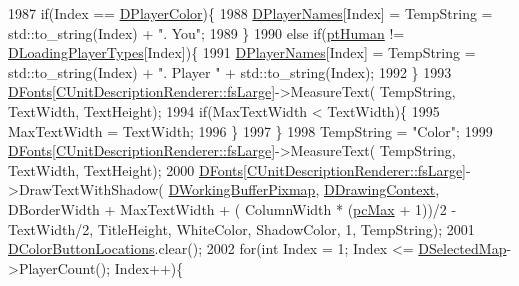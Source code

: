 \begin{DoxyCode}
1987         \textcolor{keywordflow}{if}(Index == \hyperlink{classCApplicationData_a53550939b20cba70570f113e4d1c5d02}{DPlayerColor})\{
1988             \hyperlink{classCApplicationData_a446d88c378b95b1a4f88071612229086}{DPlayerNames}[Index] = TempString = std::to\_string(Index) + \textcolor{stringliteral}{". You"};   
1989         \}
1990         \textcolor{keywordflow}{else} \textcolor{keywordflow}{if}(\hyperlink{classCApplicationData_ae04b6b340297311972ce1e955196fcaaaf06f9bc64db8860bc03ecc330b11f234}{ptHuman} != \hyperlink{classCApplicationData_a2ac5711b027842d57aa5f8e5a7adc589}{DLoadingPlayerTypes}[Index])\{
1991             \hyperlink{classCApplicationData_a446d88c378b95b1a4f88071612229086}{DPlayerNames}[Index] = TempString = std::to\_string(Index) + \textcolor{stringliteral}{". Player "} + 
      std::to\_string(Index);   
1992         \}
1993         \hyperlink{classCApplicationData_afde9247d0a3ea87393ec86dcdb1e8274}{DFonts}[\hyperlink{classCUnitDescriptionRenderer_a3ea4cd83b6dd9533ab3abb953a7da35aaf467097fe4f4811a5e2f1959c86e071d}{CUnitDescriptionRenderer::fsLarge}]->MeasureText(
      TempString, TextWidth, TextHeight);
1994         \textcolor{keywordflow}{if}(MaxTextWidth < TextWidth)\{
1995             MaxTextWidth = TextWidth;   
1996         \}
1997     \}
1998     TempString = \textcolor{stringliteral}{"Color"};
1999     \hyperlink{classCApplicationData_afde9247d0a3ea87393ec86dcdb1e8274}{DFonts}[\hyperlink{classCUnitDescriptionRenderer_a3ea4cd83b6dd9533ab3abb953a7da35aaf467097fe4f4811a5e2f1959c86e071d}{CUnitDescriptionRenderer::fsLarge}]->MeasureText(
      TempString, TextWidth, TextHeight);
2000     \hyperlink{classCApplicationData_afde9247d0a3ea87393ec86dcdb1e8274}{DFonts}[\hyperlink{classCUnitDescriptionRenderer_a3ea4cd83b6dd9533ab3abb953a7da35aaf467097fe4f4811a5e2f1959c86e071d}{CUnitDescriptionRenderer::fsLarge}]->DrawTextWithShadow(
      \hyperlink{classCApplicationData_afa34cf2780f38dd28c0c811e69d60a97}{DWorkingBufferPixmap}, \hyperlink{classCApplicationData_aa6c5bea9bdcc64398e5a3f693661d37c}{DDrawingContext}, DBorderWidth + MaxTextWidth + (
      ColumnWidth * (\hyperlink{GameDataTypes_8h_aafb0ca75933357ff28a6d7efbdd7602fa594a5c8dd3987f24e8a0f23f1a72cd34}{pcMax} + 1))/2 - TextWidth/2, TitleHeight, WhiteColor, ShadowColor, 1, TempString);
2001     \hyperlink{classCApplicationData_ac983034ed6e3eec382e22f1d2af25106}{DColorButtonLocations}.clear();
2002     \textcolor{keywordflow}{for}(\textcolor{keywordtype}{int} Index = 1; Index <= \hyperlink{classCApplicationData_abf74a18394e479b7090a8f9a55608867}{DSelectedMap}->PlayerCount(); Index++)\{

\end{DoxyCode}
